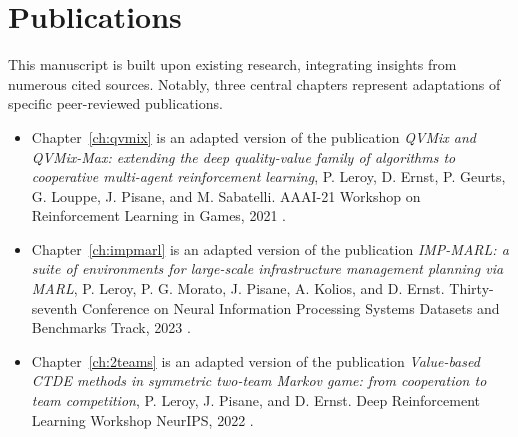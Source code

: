 \section{Publications}
\label{sec:ch1_publications}

This manuscript is built upon existing research, integrating insights from numerous cited sources.
Notably, three central chapters represent adaptations of specific peer-reviewed publications.

\begin{itemize}
\item Chapter~\ref{ch:qvmix} is an adapted version of the publication \textit{QVMix and QVMix-Max: extending the deep quality-value family of algorithms to cooperative multi-agent reinforcement learning}, P. Leroy, D. Ernst, P. Geurts, G. Louppe, J. Pisane, and M. Sabatelli. AAAI-21 Workshop on Reinforcement Learning in Games, 2021 \citep{leroy2020qvmix}.

\item Chapter~\ref{ch:impmarl} is an adapted version of the publication \textit{IMP-MARL: a suite of environments for large-scale infrastructure management planning via MARL}, P. Leroy, P. G. Morato, J. Pisane, A. Kolios, and D. Ernst. Thirty-seventh Conference on Neural Information Processing Systems Datasets and Benchmarks Track, 2023 \citep{leroy2023impmarl}.

\item Chapter~\ref{ch:2teams} is an adapted version of the publication \textit{Value-based CTDE methods in symmetric two-team Markov game: from cooperation to team competition}, P. Leroy, J. Pisane, and D. Ernst. Deep Reinforcement Learning Workshop NeurIPS, 2022 \citep{leroy2022twoteam}.
\end{itemize}



